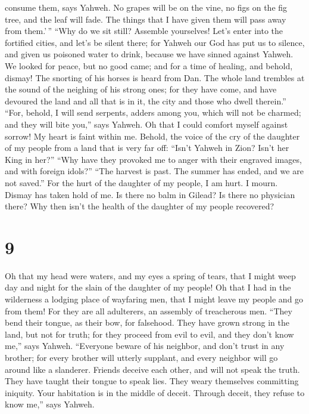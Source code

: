 consume them, says Yahweh. No grapes will be on the vine, no figs on the
fig tree, and the leaf will fade. The things that I have given them will
pass away from them.'\,''  ``Why do we sit still?
Assemble yourselves! Let's enter into the fortified cities, and let's be
silent there; for Yahweh our God has put us to silence, and given us
poisoned water to drink, because we have sinned against Yahweh.
 We looked for peace, but no good came; and for a time of
healing, and behold, dismay!  The snorting of his horses
is heard from Dan. The whole land trembles at the sound of the neighing
of his strong ones; for they have come, and have devoured the land and
all that is in it, the city and those who dwell therein.''
 ``For, behold, I will send serpents, adders among you,
which will not be charmed; and they will bite you,'' says Yahweh.
 Oh that I could comfort myself against sorrow! My heart
is faint within me.  Behold, the voice of the cry of the
daughter of my people from a land that is very far off: ``Isn't Yahweh
in Zion? Isn't her King in her?'' ``Why have they provoked me to anger
with their engraved images, and with foreign idols?'' 
``The harvest is past. The summer has ended, and we are not saved.''
 For the hurt of the daughter of my people, I am hurt. I
mourn. Dismay has taken hold of me.  Is there no balm in
Gilead? Is there no physician there? Why then isn't the health of the
daughter of my people recovered?

\hypertarget{section-8}{%
\section{9}\label{section-8}}

 Oh that my head were waters, and my eyes a spring of
tears, that I might weep day and night for the slain of the daughter of
my people!  Oh that I had in the wilderness a lodging
place of wayfaring men, that I might leave my people and go from them!
For they are all adulterers, an assembly of treacherous men.
 ``They bend their tongue, as their bow, for falsehood.
They have grown strong in the land, but not for truth; for they proceed
from evil to evil, and they don't know me,'' says Yahweh. 
``Everyone beware of his neighbor, and don't trust in any brother; for
every brother will utterly supplant, and every neighbor will go around
like a slanderer.  Friends deceive each other, and will
not speak the truth. They have taught their tongue to speak lies. They
weary themselves committing iniquity.  Your habitation is
in the middle of deceit. Through deceit, they refuse to know me,'' says
Yahweh.


